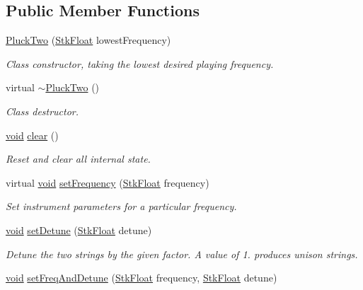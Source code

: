 \subsection*{Public Member Functions}
\begin{DoxyCompactItemize}
\item 
\hyperlink{class_nyq_1_1_pluck_two_a4114fd83f64f8aebf0b46ac9f8cbfb24}{Pluck\+Two} (\hyperlink{namespace_nyq_a044fa20a706520a617bbbf458a7db7e4}{Stk\+Float} lowest\+Frequency)
\begin{DoxyCompactList}\small\item\em Class constructor, taking the lowest desired playing frequency. \end{DoxyCompactList}\item 
virtual \hyperlink{class_nyq_1_1_pluck_two_a9586bf7797880447507af2278185ec5a}{$\sim$\+Pluck\+Two} ()
\begin{DoxyCompactList}\small\item\em Class destructor. \end{DoxyCompactList}\item 
\hyperlink{sound_8c_ae35f5844602719cf66324f4de2a658b3}{void} \hyperlink{class_nyq_1_1_pluck_two_afa341ffb904577a4681b5069fd42a82e}{clear} ()
\begin{DoxyCompactList}\small\item\em Reset and clear all internal state. \end{DoxyCompactList}\item 
virtual \hyperlink{sound_8c_ae35f5844602719cf66324f4de2a658b3}{void} \hyperlink{class_nyq_1_1_pluck_two_a697692c889b5959ea02faf6f32fad862}{set\+Frequency} (\hyperlink{namespace_nyq_a044fa20a706520a617bbbf458a7db7e4}{Stk\+Float} frequency)
\begin{DoxyCompactList}\small\item\em Set instrument parameters for a particular frequency. \end{DoxyCompactList}\item 
\hyperlink{sound_8c_ae35f5844602719cf66324f4de2a658b3}{void} \hyperlink{class_nyq_1_1_pluck_two_ab0954f22fff744210330804f4b302a25}{set\+Detune} (\hyperlink{namespace_nyq_a044fa20a706520a617bbbf458a7db7e4}{Stk\+Float} detune)
\begin{DoxyCompactList}\small\item\em Detune the two strings by the given factor. A value of 1. produces unison strings. \end{DoxyCompactList}\item 
\hyperlink{sound_8c_ae35f5844602719cf66324f4de2a658b3}{void} \hyperlink{class_nyq_1_1_pluck_two_a66df6109caaa5cd90c94da22a02a3b98}{set\+Freq\+And\+Detune} (\hyperlink{namespace_nyq_a044fa20a706520a617bbbf458a7db7e4}{Stk\+Float} frequency, \hyperlink{namespace_nyq_a044fa20a706520a617bbbf458a7db7e4}{Stk\+Float} detune)

\end{DoxyCompactItemize}
